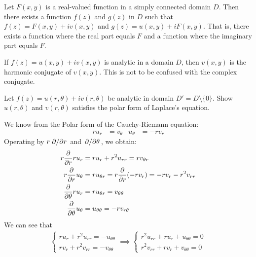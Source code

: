 \documentclass[12pt, english]{book}
\makeatletter
\renewenvironment{proof}[1][\proofname]{\par
	\pushQED{\qed}%
	\normalfont \topsep6\p@\@plus6\p@\relax
	\list{}{%
		\settowidth{\leftmargin}{\itshape\proofname:\hskip\labelsep}%
		\setlength{\labelwidth}{0pt}%
		\setlength{\itemindent}{-\leftmargin}%
	}%
	\item[\hskip\labelsep\itshape#1\@addpunct{:}]\ignorespaces
}{%
	\popQED\endlist\@endpefalse
}
\makeatother
\begin{document}
	\begin{corollary}
		Let \(F(x,y)\) is a real-valued function in a simply connected domain \(D\). Then there exists a function \(f(z)\) and \(g(z)\) in \(D\) such that \(f(z) = F(x,y) + iv(x,y)\) and \(g(z) = u(x,y) + iF(x,y)\). That is, there exists a function where the real part equals \(F\) and a function where the imaginary part equals \(F\).
	\end{corollary}

	\begin{definition}
		\label{Harmonic Conjugate Definition - Complex}
		If \(f(z) = u(x,y) + iv(x,y)\) is analytic in a domain \(D\), then \(v(x,y)\) is the harmonic conjugate of \(v(x,y)\). This is not to be confused with the complex conjugate.
	\end{definition}
	
	\begin{example}
		\label{Laplace's Equation (Polar) Exercise - Complex}
		Let \(f(z) = u(r, \theta) + iv(r, \theta)\) be analytic in domain \(D' = D \setminus \{0\}\). Show \(u(r, \theta)\) and \(v(r, \theta)\) satisfies the polar form of Laplace's equation.
		\begin{proof}{\color{Grey}
			We know from the Polar form of the Cauchy-Riemann equation:
			\begin{align*}
				ru_r &= v_\theta & u_\theta &= -rv_r
			\end{align*}
			Operating by \(r \pdv*{r}\) and \(\pdv*{\theta}\), we obtain:
			\begin{align*}
				r \pdv{r} r u_r &= ru_r + r^2 u_{rr} = r v_{\theta r} \\
				r \pdv{r} u_\theta &= ru_{\theta r} = r \pdv{r} (-rv_r) = -rv_r - r^2v_{rr} \\
				\pdv{\theta} ru_{r} &= r u_{\theta r} = v_{\theta \theta} \\
				\pdv{\theta} u_\theta &= u_{\theta \theta} = -r v_{r \theta}
			\end{align*}
			We can see that 
			\begin{align*}
				\begin{cases}
					ru_r + r^2 u_{rr} = -u_{\theta \theta} \\
					rv_r + r^2 v_{rr} = -v_{\theta \theta}
				\end{cases}
				\implies
				\begin{cases}
					r^2 u_{rr} + ru_r + u_{\theta \theta} = 0 \\
					r^2 v_{rr} + rv_r + v_{\theta \theta} = 0
				\end{cases}
			\end{align*}
			}
		\end{proof}
	\end{example}
\end{document}
